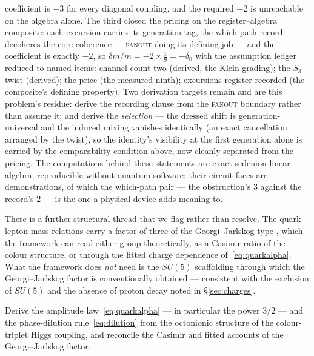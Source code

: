 \begin{openproblem}
coefficient is $-3$ for every diagonal coupling, and the required $-2$ is unreachable on the
algebra alone. The third closed the pricing on the register--algebra composite: each excursion
carries its generation tag, the which-path record decoheres the core coherence ---
\textsc{fanout} doing its defining job --- and the coefficient is exactly $-2$, so
$\delta m / m = -2 \times \tfrac19 = -\delta_0$ with the assumption ledger reduced to named
items: channel count two (derived, the Klein grading); the $S_3$ twist (derived); the price
(the measured ninth); excursions register-recorded (the composite's defining property). Two
derivation targets remain and are this problem's residue: derive the recording clause from the
\textsc{fanout} boundary rather than assume it; and derive the \emph{selection} --- the
dressed shift is generation-universal and the induced mixing vanishes identically (an exact
cancellation arranged by the twist), so the identity's visibility at the first generation alone
is carried by the comparability condition above, now cleanly separated from the pricing. The
computations behind these statements are exact sedenion linear algebra, reproducible without
quantum software; their circuit faces are demonstrations, of which the which-path pair --- the
obstruction's $3$ against the record's $2$ --- is the one a physical device adds meaning to.
\end{openproblem}

There is a further structural thread that we flag rather than resolve. The quark--lepton mass
relations carry a factor of three of the Georgi--Jarlskog type \autocite{georgijarlskog1979new},
which the framework can read either group-theoretically, as a Casimir ratio of the colour structure,
or through the fitted charge dependence of~\eqref{eq:quarkalpha}. What the framework does \emph{not}
need is the $SU(5)$ scaffolding through which the Georgi--Jarlskog factor is conventionally obtained
--- consistent with the exclusion of $SU(5)$ and the absence of proton decay noted in
\S\ref{sec:charges}.

\begin{openproblem}\label{op:colour-correction}
Derive the amplitude law~\eqref{eq:quarkalpha} --- in particular the power $3/2$ --- and the
phase-dilution rule~\eqref{eq:dilution} from the octonionic structure of the colour-triplet Higgs
coupling, and reconcile the Casimir and fitted accounts of the Georgi--Jarlskog factor.
\end{openproblem}


